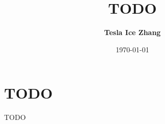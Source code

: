 \documentclass{article}
\begin{document}
  \title{TODO}
  \author{\textbf{Tesla Ice Zhang}}
  \date{\today}
  \maketitle
  \section{TODO}
    TODO
\end{document}
